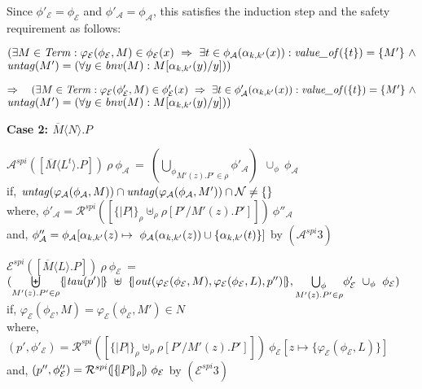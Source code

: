 \documentclass[10pt,a4paper,final,oneside,fleqn]{book}
\begin{document}
\noindent
Since $\phi'_\mathcal{E}=\phi_\mathcal{E}$ and $\phi'_\mathcal{A}=\phi_\mathcal{A}$, this satisfies the induction step and the safety requirement as follows:\vspace{5mm}

\noindent
$(\exists M\in\mbox{{\itshape Term\/}}:\varphi_\mathcal{E}(\phi_\mathcal{E},M)\in\phi_\mathcal{E}(x)~\Rightarrow~\exists t\in\phi_\mathcal{A}(\alpha_{k,k'}(x)):\mbox{{\itshape value\_of\/}}(\{t\})=\{M'\}~\wedge$\\
$\mbox{{\itshape untag\/}}(M')=(\forall y\in\mbox{{\itshape bnv\/}}(M):M[\alpha_{k,k'}(y)/y]))$\vspace{5mm}

\noindent
$\Rightarrow~~~(\exists M\in\mbox{{\itshape Term\/}}:\varphi_\mathcal{E}(\phi'_\mathcal{E},M)\in\phi'_\mathcal{E}(x)~\Rightarrow~\exists t\in\phi'_\mathcal{A}(\alpha_{k,k'}(x)): \mbox{{\itshape value\_of\/}}(\{t\})=\{M'\}~\wedge$\\
$\mbox{{\itshape untag\/}}(M')=(\forall y\in\mbox{{\itshape bnv\/}}(M):M[\alpha_{k,k'}(y)/y]))$\vspace{5mm}

\noindent
{\bf Case 2: $\overline{M}\langle N\rangle.P$}

\noindent
$\mathcal{A}^{spi}(\![\overline{M}\langle L^t\rangle.P]\!)~\rho~\phi_\mathcal{A}~=~(\underset{M'(z).P'\in\rho}{\bigcup_\phi}\phi'_\mathcal{A})~~\cup_\phi~\phi_\mathcal{A}$\\
if, $\mbox{{\itshape untag\/}}(\varphi_\mathcal{A}(\phi_\mathcal{A},M))\cap\mbox{{\itshape untag\/}}(\varphi_\mathcal{A}(\phi_\mathcal{A},M'))\cap\mathcal{N}\ne\{\}$\\
where, $\phi'_\mathcal{A}=\mathcal{R}^{spi}(\![\{\!|P|\!\}_\rho\uplus_\rho\rho[P'/M'(z).P']]\!)~\phi''_\mathcal{A}$\\
and, $\phi''_\mathcal{A}=\phi_\mathcal{A}[\alpha_{k,k'}(z)\mapsto~\phi_\mathcal{A}(\alpha_{k,k'}(z))\cup\{\alpha_{k,k'}(t)\}]\hfill$ by $(\mathcal{A}^{spi} 3)$\vspace{5mm}

\noindent
$\mathcal{E}^{spi}(\![\overline{M}\langle L\rangle.P]\!)~\rho~\phi_\mathcal{E}~=~$\\
$(\underset{M'(z).P'\in\rho}{\biguplus}\{\!|\mbox{{\itshape tau\/}}(p')|\!\}~\uplus~\{\!|\mbox{{\itshape out\/}}(\varphi_\mathcal{E}(\phi_\mathcal{E},M),\varphi_\mathcal{E}(\phi_\mathcal{E},L),p'')|\!\},\underset{M'(z).P'\in\rho}{\bigcup_\phi}\phi'_\mathcal{E}~\cup_\phi~\phi_\mathcal{E})$\\
if, $\varphi_\mathcal{E}(\phi_\mathcal{E},M)=\varphi_\mathcal{E}(\phi_\mathcal{E},M')\in N$\\
where, $(p',\phi'_\mathcal{E})=\mathcal{R}^{spi}(\![\{\!|P|\!\}_\rho\uplus_\rho\rho[P'/M'(z).P']]\!)~\phi_\mathcal{E}[z\mapsto\{\varphi_\mathcal{E}(\phi_\mathcal{E},L)\}]$\\
and, $(p'',\phi''_\mathcal{E})=\mathcal{R}^{spi}(\![\{\!|P|\!\}_\rho]\!)~\phi_\mathcal{E}\hfill$ by $(\mathcal{E}^{spi} 3)$\vspace{5mm}
\end{document}
